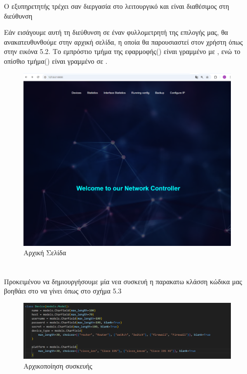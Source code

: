 Ο εξυπηρετητής τρέχει σαν διεργασία στο λειτουργικό
και είναι διαθέσιμος στη διεύθυνση 

Εάν εισάγουμε αυτή τη διεύθυνση σε έναν 
φυλλομετρητή της επιλογής μας, θα ανακατευθυνθούμε 
στην αρχική σελίδα, η οποία θα παρουσιαστεί στον 
χρήστη όπως στην εικόνα 5.2. Το εμπρόστιο τμήμα της εφαρμοφής() 
είναι γραμμένο με , ενώ το οπίσθιο τμήμα() 
είναι γραμμένο σε .

\begin{figure}[h]
	\centering
	\includegraphics[width=1.2\textwidth]{graphics/home_page.png}
	\caption{ Αρχική Σελίδα}
\end{figure}

\FloatBarrier %

\section{}

Προκειμένου να δημιουργήσουμε μία νεα συσκευή η παρακατω κλάσση
κώδικα μας βοηθάει στο να γίνει όπως στο σχήμα 5.3

\begin{figure}[htb]
	\centering
	\includegraphics[width=1.2\textwidth]{graphics/class_device.png}
	\caption{Αρχικοποίηση συσκευής}
\end{figure}

